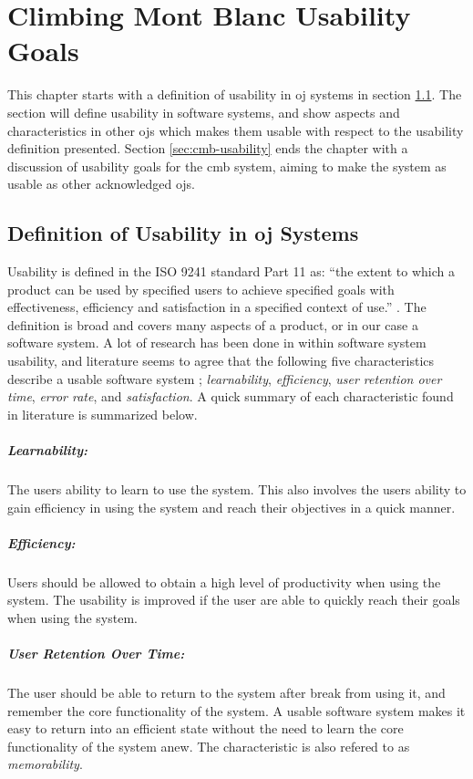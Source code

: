 \chapter{Climbing Mont Blanc Usability Goals}
This chapter starts with a definition of usability in \gls{oj} systems in section \ref{sec:usability-def}. The section will define usability in software systems, and show aspects and characteristics in other \gls{ojs} which makes them usable with respect to the usability definition presented. Section \ref{sec:cmb-usability} ends the chapter with a discussion of usability goals for the \gls{cmb} system, aiming to make the system as usable as other acknowledged \gls{ojs}.

\section{Definition of Usability in \gls{oj} Systems}
\label{sec:usability-def}
Usability is defined in the ISO 9241 standard Part 11 as: ``the extent to which a product can be used by specified users to achieve specified goals with effectiveness, efficiency and satisfaction in a specified context of use.'' \cite{ISO1998}. The definition is broad and covers many aspects of a product, or in our case a software system. A lot of research has been done in within software system usability, and literature seems to agree that the following five characteristics describe a usable software system \cite{holzinger2005, ferre2001}; \textit{learnability}, \textit{efficiency}, \textit{user retention over time}, \textit{error rate}, and \textit{satisfaction}. A quick summary of each characteristic found in literature is summarized below.

\paragraph*{Learnability:} The users ability to learn to use the system. This also involves the users ability to gain efficiency in using the system and reach their objectives in a quick manner.

\paragraph*{Efficiency:} Users should be allowed to obtain a high level of productivity when using the system. The usability is improved if the user are able to quickly reach their goals when using the system.

\paragraph*{User Retention Over Time:} The user should be able to return to the system after break from using it, and remember the core functionality of the system. A usable software system makes it easy to return into an efficient state without the need to learn the core functionality of the system anew. The characteristic is also refered to as \textit{memorability}.

